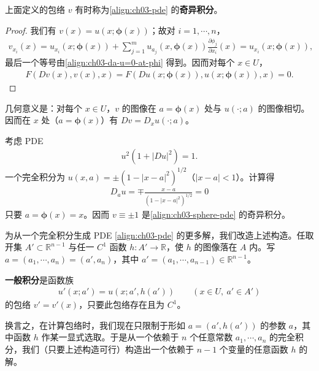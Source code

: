 \documentclass[../../main.tex]{subfiles}
\begin{document}
上面定义的包络 $v$ 有时称为\eqref{align:ch03-pde} 的\textbf{奇异积分}。

\begin{proof}
我们有 $v(x)=u(x;\boldsymbol{\phi}(x))$；故对 $i=1,\cdots,n$，
\begin{align*}
v_{x_i}(x)=u_{x_i}(x;\boldsymbol{\phi}(x))+\sum_{j=1}^m u_{a_j}(x,\boldsymbol{\phi}(x))\frac{\partial\phi_j}{\partial x_i}(x)
=u_{x_i}(x;\boldsymbol{\phi}(x)),
\end{align*}
最后一个等号由\eqref{align:ch03-da-u=0-at-phi} 得到。因而对每个 $x\in U$，
\begin{align*}
F(Dv(x),v(x),x)=F(Du(x;\boldsymbol{\phi}(x)),u(x;\boldsymbol{\phi}(x)),x)=0.
\end{align*}
\end{proof}

几何意义是：对每个 $x\in U$，$v$ 的图像在 $a=\boldsymbol{\phi}(x)$ 处与 $u(\cdot;a)$ 的图像相切。因而在 $x$ 处（$a=\boldsymbol{\phi}(x)$）有 $Dv=D_x u(\cdot;a)$。

\begin{example}\label{example:ch03-sphere}
考虑 PDE
\begin{align}\label{align:ch03-sphere-pde}
u^2(1+|Du|^2)=1.
\end{align}
一个完全积分为 $u(x,a)=\pm(1-|x-a|^2)^{1/2}$（$|x-a|<1$）。计算得
\begin{align*}
D_a u=\mp\frac{x-a}{(1-|x-a|^2)^{1/2}}=0
\end{align*}
只要 $a=\boldsymbol{\phi}(x)=x$。因而 $v\equiv\pm 1$ 是\eqref{align:ch03-sphere-pde} 的奇异积分。
\end{example}

为从一个完全积分生成 PDE \eqref{align:ch03-pde} 的更多解，我们改造上述构造。任取开集 $A'\subset\mathbb{R}^{n-1}$ 与任一 $C^1$ 函数 $h:A'\to\mathbb{R}$，使 $h$ 的图像落在 $A$ 内。写 $a=(a_1,\cdots,a_n)=(a',a_n)$，其中 $a'=(a_1,\cdots,a_{n-1})\in\mathbb{R}^{n-1}$。

\begin{definition}[依赖于 $h$ 的]\label{definition:ch03-general}\textbf{一般积分}是函数族
\begin{align*}
u'(x;a')=u(x;a',h(a')) \qquad (x\in U,\ a'\in A')
\end{align*}
的包络 $v'=v'(x)$，只要此包络存在且为 $C^1$。
\end{definition}

换言之，在计算包络时，我们现在只限制于形如 $a=(a',h(a'))$ 的参数 $a$，其中函数 $h$ 作某一显式选取。于是从一个依赖于 $n$ 个任意常数 $a_1,\cdots,a_n$ 的完全积分，我们（只要上述构造可行）构造出一个依赖于 $n-1$ 个变量的任意函数 $h$ 的解。
\end{document}
